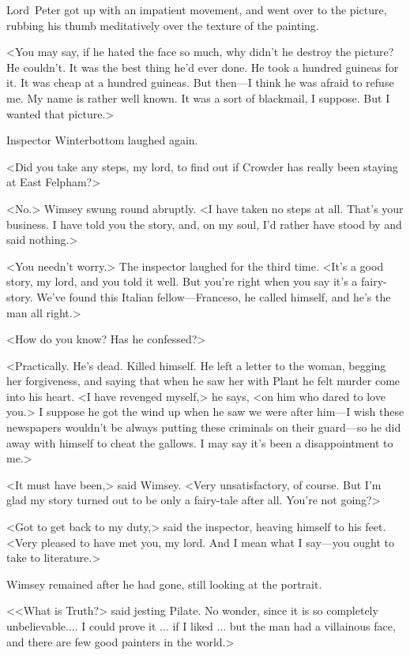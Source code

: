 Lord~Peter got up with an impatient movement, and went over to the picture, rubbing his thumb meditatively over the texture of the painting.

<You may say, if he hated the face so much, why didn't he destroy the picture? He couldn't. It was the best thing he'd ever done. He took a hundred guineas for it. It was cheap at a hundred guineas. But then—I think he was afraid to refuse me. My name is rather well known. It was a sort of blackmail, I suppose. But I wanted that picture.>

Inspector Winterbottom laughed again.

<Did you take any steps, my lord, to find out if Crowder has really been staying at East Felpham?>

<No.> Wimsey swung round abruptly. <I have taken no steps at all. That's your business. I have told you the story, and, on my soul, I'd rather have stood by and said nothing.>

<You needn't worry.> The inspector laughed for the third time. <It's a good story, my lord, and you told it well. But you're right when you say it's a fairy-story. We've found this Italian fellow—Franceso, he called himself, and he's the man all right.>

<How do you know? Has he confessed?>

<Practically. He's dead. Killed himself. He left a letter to the woman, begging her forgiveness, and saying that when he saw her with Plant he felt murder come into his heart. <I have revenged myself,> he says, <on him who dared to love you.> I suppose he got the wind up when he saw we were after him—I wish these newspapers wouldn't be always putting these criminals on their guard—so he did away with himself to cheat the gallows. I may say it's been a disappointment to me.>

<It must have been,> said Wimsey. <Very unsatisfactory, of course. But I'm glad my story turned out to be only a fairy-tale after all. You're not going?>

<Got to get back to my duty,> said the inspector, heaving himself to his feet. <Very pleased to have met you, my lord. And I mean what I say—you ought to take to literature.>

Wimsey remained after he had gone, still looking at the portrait.

<<What is Truth?> said jesting Pilate. No wonder, since it is so completely unbelievable.... I could prove it ... if I liked ... but the man had a villainous face, and there are few good painters in the world.>